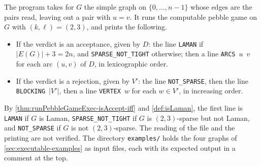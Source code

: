 The program takes for $G$ the simple graph on $\{0, \ldots, n - 1\}$
whose edges are the pairs read, leaving out a pair with $u = v$. It runs
the computable pebble game on $G$ with $(k, \ell) = (2, 3)$, and prints
the following.
\begin{itemize}
  \item If the verdict is an acceptance, given by $D$: the line
    \texttt{LAMAN} if $|E(G)| + 3 = 2n$, and \texttt{SPARSE\_NOT\_TIGHT}
    otherwise; then a line \texttt{ARCS}~$u$~$v$ for each arc $(u, v)$
    of $D$, in lexicographic order.
  \item If the verdict is a rejection, given by $V'$: the line
    \texttt{NOT\_SPARSE}, then the line \texttt{BLOCKING}~$|V'|$, then a
    line \texttt{VERTEX}~$w$ for each $w \in V'$, in increasing order.
\end{itemize}
By \cref{thm:runPebbleGameExec-isAccept-iff} and \cref{def:isLaman}, the
first line is \texttt{LAMAN} if $G$ is Laman, \texttt{SPARSE\_NOT\_TIGHT}
if $G$ is $(2, 3)$-sparse but not Laman, and \texttt{NOT\_SPARSE} if $G$
is not $(2, 3)$-sparse. The reading of the file and the printing are not
verified. The directory \texttt{examples/} holds the four graphs of
\cref{sec:executable-examples} as input files, each with its expected
output in a comment at the top.
